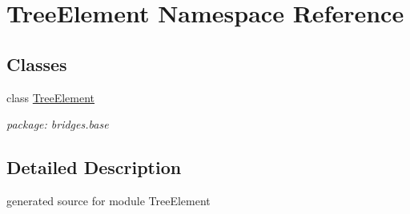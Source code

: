 \hypertarget{namespace_tree_element}{}\section{Tree\+Element Namespace Reference}
\label{namespace_tree_element}
\subsection*{Classes}
\begin{DoxyCompactItemize}
\item 
class \hyperlink{class_tree_element_1_1_tree_element}{Tree\+Element}
\begin{DoxyCompactList}\small\item\em package\+: bridges.\+base \end{DoxyCompactList}\end{DoxyCompactItemize}


\subsection{Detailed Description}
\begin{DoxyVerb}generated source for module TreeElement \end{DoxyVerb}
 